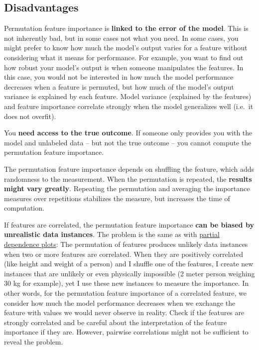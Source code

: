 \documentclass[
  10pt,
]{scrbook}
\begin{document}
\hypertarget{disadvantages-9}{%
\subsection{Disadvantages}\label{disadvantages-9}}

Permutation feature importance is \textbf{linked to the error of the model}.
This is not inherently bad, but in some cases not what you need.
In some cases, you might prefer to know how much the model's output varies for a feature without considering what it means for performance.
For example, you want to find out how robust your model's output is when someone manipulates the features.
In this case, you would not be interested in how much the model performance decreases when a feature is permuted, but how much of the model's output variance is explained by each feature.
Model variance (explained by the features) and feature importance correlate strongly when the model generalizes well (i.e.~it does not overfit).

You \textbf{need access to the true outcome}.
If someone only provides you with the model and unlabeled data -- but not the true outcome -- you cannot compute the permutation feature importance.

The permutation feature importance depends on shuffling the feature, which adds randomness to the measurement.
When the permutation is repeated, the \textbf{results might vary greatly}.
Repeating the permutation and averaging the importance measures over repetitions stabilizes the measure, but increases the time of computation.

If features are correlated, the permutation feature importance \textbf{can be biased by unrealistic data instances}.
The problem is the same as with \protect\hyperlink{pdp}{partial dependence plots}:
The permutation of features produces unlikely data instances when two or more features are correlated.
When they are positively correlated (like height and weight of a person) and I shuffle one of the features, I create new instances that are unlikely or even physically impossible (2 meter person weighing 30 kg for example), yet I use these new instances to measure the importance.
In other words, for the permutation feature importance of a correlated feature, we consider how much the model performance decreases when we exchange the feature with values we would never observe in reality.
Check if the features are strongly correlated and be careful about the interpretation of the feature importance if they are.
However, pairwise correlations might not be sufficient to reveal the problem.
\end{document}
